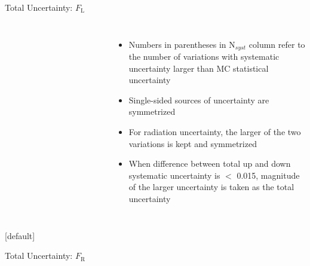 \documentclass{beamer}
\newcommand*{\fl}{\ensuremath{F_{\text{L}}}\xspace}
\newcommand*{\fr}{\ensuremath{F_{\text{R}}}\xspace}
\begin{document}
{\begin{frame}{Total Uncertainty: \fl}
\begin{columns}
\begin{table}[h!]
\begin{tabular}{lcccc}
          \hline\hline
        \end{tabular}
        
      \end{table}
      \begin{itemize}\footnotesize
        \item Numbers in parentheses in N$_{syst}$ column refer to the number of variations with systematic uncertainty larger than MC statistical uncertainty
        \item Single-sided sources of uncertainty are symmetrized
        \item For radiation uncertainty, the larger of the two variations is kept and symmetrized
        \item  When difference between total up and down systematic uncertainty is $<$ 0.015, magnitude of the larger uncertainty is taken as the total uncertainty
      \end{itemize}
    \end{columns}
    
  \end{frame}


  \makeatletter %
  [default]
  \def\beamer@entrycode{\vspace*{-1.075\headheight}}
  \begin{frame}{Total Uncertainty: \fr}
    \begin{columns}
      \vspace{-14pt}
      \begin{table}[h!]\fontsize{5}{6}\selectfont
        \centering
        

\end{table}
\end{columns}
\end{frame}}
\end{document}
